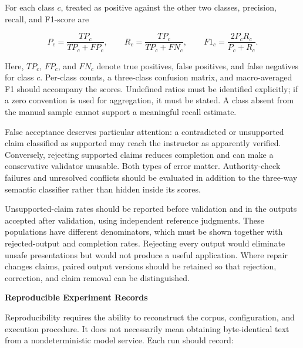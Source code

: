 \documentclass[12pt,a4paper]{report}
\numberwithin{equation}{chapter}
\begin{document}
For each class \(c\), treated as positive against the other two classes, precision, recall, and F1-score are

\begin{equation}
\label{eq:claim-classification}
P_c=\frac{TP_c}{TP_c+FP_c},
\qquad
R_c=\frac{TP_c}{TP_c+FN_c},
\qquad
F1_c=\frac{2P_cR_c}{P_c+R_c}.
\end{equation}

Here, \(TP_c\), \(FP_c\), and \(FN_c\) denote true positives, false positives, and false negatives for class \(c\). Per-class counts, a three-class confusion matrix, and macro-averaged F1 should accompany the scores. Undefined ratios must be identified explicitly; if a zero convention is used for aggregation, it must be stated. A class absent from the manual sample cannot support a meaningful recall estimate.

False acceptance deserves particular attention: a contradicted or unsupported claim classified as supported may reach the instructor as apparently verified. Conversely, rejecting supported claims reduces completion and can make a conservative validator unusable. Both types of error matter. Authority-check failures and unresolved conflicts should be evaluated in addition to the three-way semantic classifier rather than hidden inside its scores.

Unsupported-claim rates should be reported before validation and in the outputs accepted after validation, using independent reference judgments. These populations have different denominators, which must be shown together with rejected-output and completion rates. Rejecting every output would eliminate unsafe presentations but would not produce a useful application. Where repair changes claims, paired output versions should be retained so that rejection, correction, and claim removal can be distinguished.

\par\medskip
\textbf{Reproducible Experiment Records}

Reproducibility requires the ability to reconstruct the corpus, configuration, and execution procedure. It does not necessarily mean obtaining byte-identical text from a nondeterministic model service. Each run should record:
\end{document}
